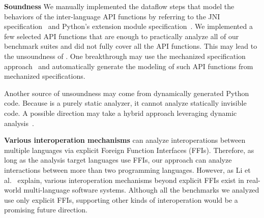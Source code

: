 \textbf{Soundness} We manually implemented the dataflow steps that model the
behaviors of the inter-language API functions by referring to the JNI
specification~\cite{jnispec} and Python's extension module
specification~\cite{pythoncspec}.  We implemented a few selected API functions
that are enough to practically analyze all of our benchmark suites and did not
fully cover all the API functions.  This may lead to the unsoundness of \ours.
One breakthrough may use the mechanized specification
approach~\cite{jiset,jest,jstar,jsaver,justgen} and automatically generate the
modeling of such API functions from mechanized specifications.

Another source of unsoundness may come from dynamically generated Python code.
Because \ours is a purely static analyzer, it cannot analyze statically
invisible code.  A possible direction may take a hybrid approach leveraging
dynamic analysis~\cite{polycruise}.

\textbf{Various interoperation mechanisms} \ours can analyze interoperations
between multiple languages via explicit Foreign Function Interfaces (FFIs).
Therefore, as long as the analysis target languages use FFIs, our approach can
analyze interactions between more than two programming languages.  However, as
Li et al.~\cite{vulnerable-multi} explain, various interoperation mechanisms
beyond explicit FFIs exist in real-world multi-language software systems.
Although all the benchmarks we analyzed use only explicit FFIs, supporting
other kinds of interoperation would be a promising future direction.
